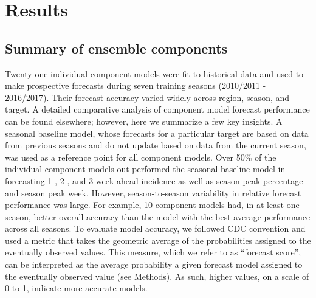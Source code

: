 \documentclass{article}\usepackage[]{graphicx}\usepackage[]{color}
\begin{document}
\section{Results}

\subsection{Summary of ensemble components} \label{subsec:comp-models}




Twenty-one individual component models were fit to historical data and used to make prospective forecasts during seven training seasons (2010/2011 - 2016/2017). 
Their forecast accuracy varied widely across region, season, and target.
A detailed comparative analysis of component model forecast performance can be found elsewhere\cite{Reich2018}; however, here we summarize a few key insights.
A seasonal baseline model, whose forecasts for a particular target are based on data from previous seasons and do not update based on data from the current season, was used as a reference point for all component models.
Over 50\% of the individual component models out-performed the seasonal baseline model in forecasting 1-, 2-, and 3-week ahead incidence as well as season peak percentage and season peak week.
However, season-to-season variability in relative forecast performance was large.
For example, 10 component models had, in at least one season, better overall accuracy than the model with the best average performance across all seasons. 
To evaluate model accuracy, we followed CDC convention and used a metric that takes the geometric average of the probabilities assigned to the eventually observed values. 
This measure, which we refer to as ``forecast score'', can be interpreted as the average probability a given forecast model assigned to the eventually observed value  (see Methods).
As such, higher values, on a scale of 0 to 1, indicate more accurate models.

\end{document}
